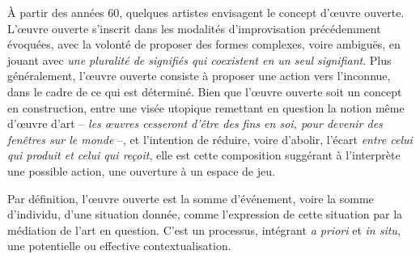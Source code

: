 \documentclass{article}
\begin{document}
À partir des années 60, quelques artistes envisagent le concept d'œuvre ouverte. L'œuvre ouverte s'inscrit dans les modalités d'improvisation précédemment évoquées, avec la volonté de proposer des formes complexes, voire ambiguës, en jouant avec \textit{une pluralité de signifiés qui coexistent en un seul signifiant}. %
Plus généralement, l'œuvre ouverte consiste à proposer une action vers l'inconnue, dans le cadre de ce qui est déterminé. Bien que l'œuvre ouverte soit un concept en construction, entre une visée utopique remettant en question la notion même d'œuvre d'art -- \textit{les œuvres cesseront d'être des fins en soi, pour devenir des fenêtres sur le monde} --, et l'intention de réduire, voire d'abolir, l'écart \textit{entre celui qui produit et celui qui reçoit}, elle est cette composition suggérant à l'interprète une possible action, une ouverture à un espace de jeu. 


Par définition, l'œuvre ouverte est la somme d'événement, voire la somme d'individu, d'une situation donnée, comme l'expression de cette situation par la médiation de l'art en question. C'est un processus, intégrant \textit{a priori} et \textit{in situ}, une potentielle ou effective contextualisation.
\end{document}
